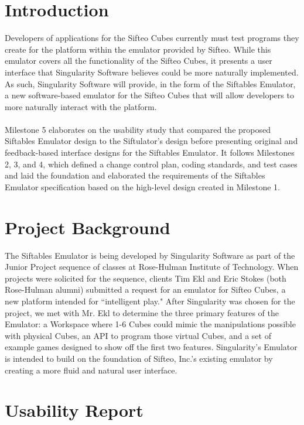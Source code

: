 \documentclass[12pt]{article}
\begin{document}
\section{Introduction}
Developers of applications for the \gls{Sifteo Cubes} currently must test programs they create for the platform within the emulator provided by Sifteo. While this emulator covers all  the functionality of the Sifteo Cubes, it presents a user interface that Singularity Software believes could be more naturally implemented. As such, Singularity Software will provide, in the form of the Siftables Emulator, a new software-based emulator for the Sifteo Cubes that will allow developers to more naturally interact with the platform.\\\\
Milestone 5 elaborates on the \gls{usability study} that compared the proposed Siftables Emulator design to the Siftulator's design before presenting original and feedback-based interface designs for the Siftables Emulator. It follows Milestones 2, 3, and 4, which defined a change control plan, coding standards, and test cases and laid the foundation and elaborated the requirements of the Siftables Emulator specification based on the high-level design created in Milestone 1. 

\section{Project Background}
The Siftables Emulator is being developed by Singularity Software as part of the Junior Project sequence of classes at Rose-Hulman Institute of Technology. When projects were solicited for the sequence, clients Tim Ekl and Eric Stokes (both Rose-Hulman alumni) submitted a request for an emulator for Sifteo Cubes, a new platform intended for ``intelligent play." After Singularity was chosen for the project, we met with Mr. Ekl to determine the three primary features of the Emulator: a Workspace where 1-6 Cubes could mimic the manipulations possible with physical Cubes, an \gls{API} to program those virtual Cubes, and a set of example games designed to show off the first two features. Singularity's Emulator is intended to build on the foundation of Sifteo, Inc.'s existing emulator by creating a more fluid and natural user interface.

\section{Usability Report}
\end{document}
